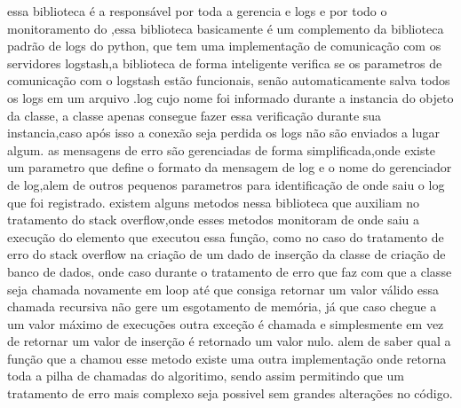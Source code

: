 \documentclass[
	12pt,				%
	openright,			%
	oneside,			%
	a4paper,			%
	english,			%
	french,				%
	spanish,			%
	brazil,				%
	]{abntex2}
\begin{document}
essa biblioteca é a responsável por toda a gerencia e logs e por todo o monitoramento do ,essa biblioteca basicamente é um complemento da biblioteca padrão de logs do python,
que tem uma implementação de comunicação com os servidores logstash,a biblioteca de forma inteligente verifica se os parametros de comunicação com o logstash estão funcionais,
senão automaticamente salva todos os logs em um arquivo .log cujo nome foi informado durante a instancia do objeto da classe,
a classe apenas consegue fazer essa verificação durante sua instancia,caso após isso a conexão seja perdida os logs não são enviados a lugar algum.
as mensagens de erro são gerenciadas de forma simplificada,onde existe um parametro que define o formato da mensagem de log e o nome do gerenciador de log,alem de outros pequenos parametros para identificação de onde saiu o log que foi registrado.
existem alguns metodos nessa biblioteca que auxiliam no tratamento do stack overflow,onde esses metodos monitoram de onde saiu a execução do elemento que executou essa função,
como no caso do tratamento de erro do stack overflow na criação de um dado de inserção da classe de criação de banco de dados,
onde caso durante o tratamento de erro que faz com que a classe seja chamada novamente em loop até que consiga retornar um valor válido essa chamada recursiva não gere um esgotamento de memória,
já que caso chegue a um valor máximo de execuções outra exceção é chamada e simplesmente em vez de retornar um valor de inserção é retornado um valor nulo.
alem de saber qual a função que a chamou esse metodo existe uma outra implementação onde retorna toda a pilha de chamadas do algoritimo,
sendo assim permitindo que um tratamento de erro mais complexo seja possivel sem grandes alterações no código.
\end{document}
